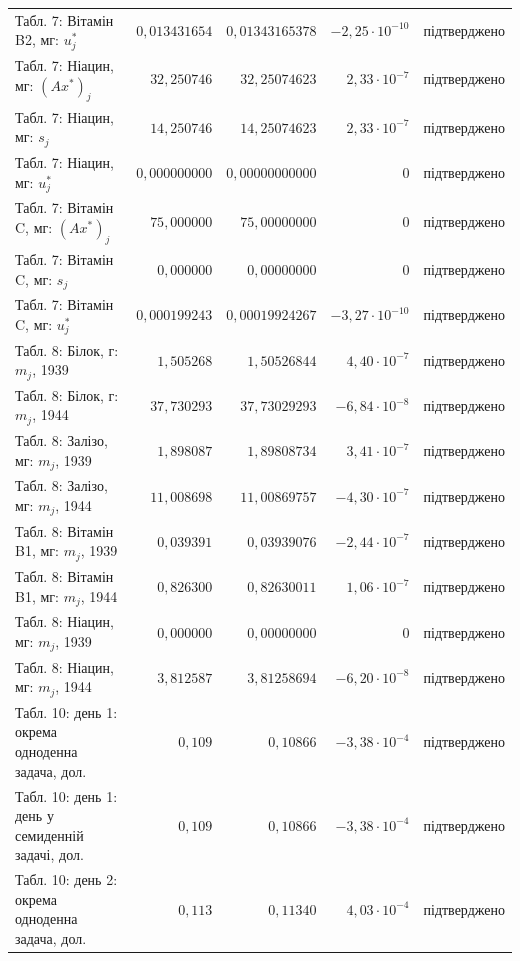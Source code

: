 {\begin{longtable}{>{\raggedright}p{4.3cm}rrr>{\raggedright\arraybackslash}p{2.3cm}}
Табл. 7: Вітамін B2, мг: $u_j^*$ & $0{,}013431654$ & $0{,}01343165378$ & $-2{,}25\cdot10^{-10}$ & підтверджено \\
Табл. 7: Ніацин, мг: $(Ax^*)_j$ & $32{,}250746$ & $32{,}25074623$ & $2{,}33\cdot10^{-7}$ & підтверджено \\
Табл. 7: Ніацин, мг: $s_j$ & $14{,}250746$ & $14{,}25074623$ & $2{,}33\cdot10^{-7}$ & підтверджено \\
Табл. 7: Ніацин, мг: $u_j^*$ & $0{,}000000000$ & $0{,}00000000000$ & $0$ & підтверджено \\
Табл. 7: Вітамін C, мг: $(Ax^*)_j$ & $75{,}000000$ & $75{,}00000000$ & $0$ & підтверджено \\
Табл. 7: Вітамін C, мг: $s_j$ & $0{,}000000$ & $0{,}00000000$ & $0$ & підтверджено \\
Табл. 7: Вітамін C, мг: $u_j^*$ & $0{,}000199243$ & $0{,}00019924267$ & $-3{,}27\cdot10^{-10}$ & підтверджено \\
Табл. 8: Білок, г: $m_j$, 1939 & $1{,}505268$ & $1{,}50526844$ & $4{,}40\cdot10^{-7}$ & підтверджено \\
Табл. 8: Білок, г: $m_j$, 1944 & $37{,}730293$ & $37{,}73029293$ & $-6{,}84\cdot10^{-8}$ & підтверджено \\
Табл. 8: Залізо, мг: $m_j$, 1939 & $1{,}898087$ & $1{,}89808734$ & $3{,}41\cdot10^{-7}$ & підтверджено \\
Табл. 8: Залізо, мг: $m_j$, 1944 & $11{,}008698$ & $11{,}00869757$ & $-4{,}30\cdot10^{-7}$ & підтверджено \\
Табл. 8: Вітамін B1, мг: $m_j$, 1939 & $0{,}039391$ & $0{,}03939076$ & $-2{,}44\cdot10^{-7}$ & підтверджено \\
Табл. 8: Вітамін B1, мг: $m_j$, 1944 & $0{,}826300$ & $0{,}82630011$ & $1{,}06\cdot10^{-7}$ & підтверджено \\
Табл. 8: Ніацин, мг: $m_j$, 1939 & $0{,}000000$ & $0{,}00000000$ & $0$ & підтверджено \\
Табл. 8: Ніацин, мг: $m_j$, 1944 & $3{,}812587$ & $3{,}81258694$ & $-6{,}20\cdot10^{-8}$ & підтверджено \\
Табл. 10: день 1: окрема одноденна задача, дол. & $0{,}109$ & $0{,}10866$ & $-3{,}38\cdot10^{-4}$ & підтверджено \\
Табл. 10: день 1: день у семиденній задачі, дол. & $0{,}109$ & $0{,}10866$ & $-3{,}38\cdot10^{-4}$ & підтверджено \\
Табл. 10: день 2: окрема одноденна задача, дол. & $0{,}113$ & $0{,}11340$ & $4{,}03\cdot10^{-4}$ & підтверджено \\

\end{longtable}}
